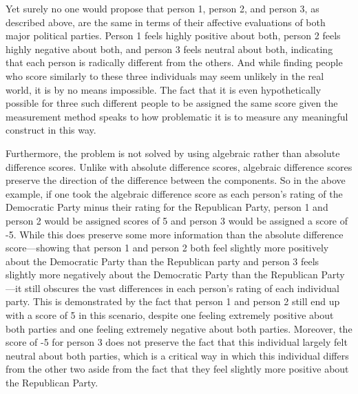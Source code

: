 \documentclass[authordate, meta, issue]{jote-new-article}
\begin{document}
	Yet surely no one would propose that person 1, person 2, and person 3, as described above, are the same in terms of their affective evaluations of both major political parties. Person 1 feels highly positive about both, person 2 feels highly negative about both, and person 3 feels neutral about both, indicating that each person is radically different from the others. And while finding people who score similarly to these three individuals may seem unlikely in the real world, it is by no means impossible. The fact that it is even hypothetically possible for three such different people to be assigned the same score given the measurement method speaks to how problematic it is to measure any meaningful construct in this way.



	Furthermore, the problem is not solved by using algebraic rather than absolute difference scores. Unlike with absolute difference scores, algebraic difference scores preserve the direction of the difference between the components. So in the above example, if one took the algebraic difference score as each person's rating of the Democratic Party minus their rating for the Republican Party, person 1 and person 2 would be assigned scores of 5 and person 3 would be assigned a score of -5. While this does preserve some more information than the absolute difference score—showing that person 1 and person 2 both feel slightly more positively about the Democratic Party than the Republican party and person 3 feels slightly more negatively about the Democratic Party than the Republican Party—it still obscures the vast differences in each person's rating of each individual party. This is demonstrated by the fact that person 1 and person 2 still end up with a score of 5 in this scenario, despite one feeling extremely positive about both parties and one feeling extremely negative about both parties. Moreover, the score of -5 for person 3 does not preserve the fact that this individual largely felt neutral about both parties, which is a critical way in which this individual differs from the other two aside from the fact that they feel slightly more positive about the Republican Party.
\end{document}
